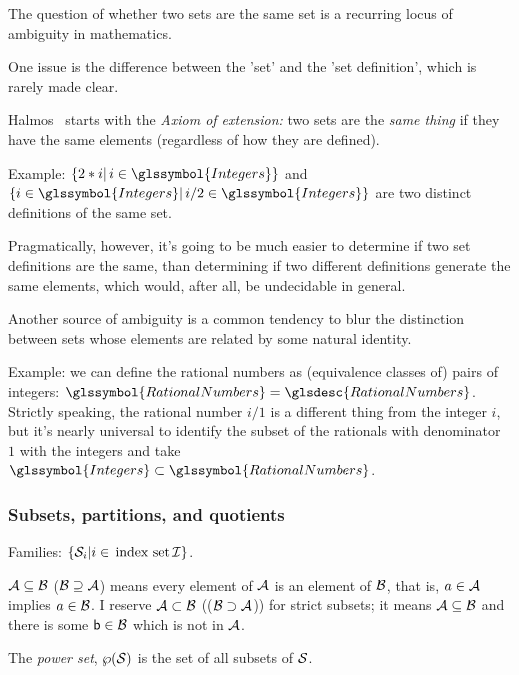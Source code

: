 The question of whether two sets are the same set is a recurring
locus of ambiguity in mathematics.

One issue is the difference between the 'set' and the 
'set definition', which is rarely made clear.

Halmos~\cite{Halmos1960Naive} starts with the \emph{Axiom of
extension:} two sets are the \emph{same thing} if they have the
same elements (regardless of how they are defined).

Example: 
$\{ 2*i | \, i \in \glssymbol{Integers} \}$
and
$\{ i \in \glssymbol{Integers} |
 \, i/2 \in \glssymbol{Integers} \}$
are two distinct definitions of the same set. 
 
Pragmatically, however, it's going to be much easier to determine
if two set definitions are the same, than determining if two
different definitions generate the same elements, which would,
after all, be undecidable in general.

Another source of ambiguity is a common tendency to blur the 
distinction between sets whose elements are related by some natural
identity. 

Example: we can define the rational numbers as (equivalence
classes of) pairs of integers:
$\glssymbol{RationalNumbers} = \glsdesc{RationalNumbers}$.
Strictly speaking, the rational number $i/1$ is a different thing
from the integer $i$, but it's nearly universal to identify the
subset of the rationals with denominator $1$ with the integers and
take $\glssymbol{Integers} \subset \glssymbol{RationalNumbers}$.

\subsubsection{Subsets, partitions, and quotients}

Families: $\{ \mathcal{S}_{i} | i \in \, \text{index set} \, \mathcal{I}
\}$.



$\mathcal{A} \subseteq \mathcal{B}$ ($\mathcal{B} \supseteq \mathcal{A}$)
means
every element of $\mathcal{A}$ is an element of $\mathcal{B}$, 
that is, $a \in \mathcal{A}$ 
implies $a \in \mathcal{B}$.
I reserve $\mathcal{A} \subset \mathcal{B}$ (($\mathcal{B} \supset
\mathcal{A}$)) for strict subsets;
it means $\mathcal{A} \subseteq \mathcal{B}$
and there is some $\mathsf{b}\in\mathcal{B}$ which
is not in $\mathcal{A}$.



The \emph{power set}, ${\displaystyle \wp}(\mathcal{S})$ is the set 
of all subsets of
$\mathcal{S}$.


